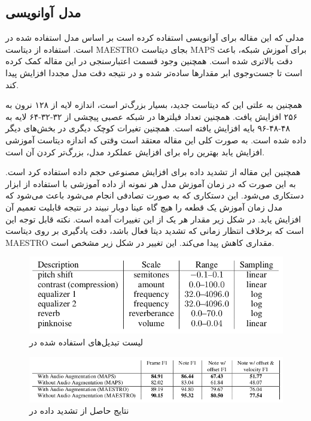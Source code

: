 \subsection{مدل آوانویسی}
مدلی که این مقاله برای آوانویسی استفاده کرده است بر اساس مدل استفاده شده در
\cite{hawthorne2017onsets}
است. استفاده از دیتاست
MAESTRO
بجای دیتاست
MAPS
برای آموزش شبکه، باعث دقت بالاتری شده است. همچنین وجود قسمت اعتبارسنجی در این
مقاله کمک کرده است تا جست‌وجوی ابر مقدارها ساده‌تر شده و در نتیجه دقت مدل مجددا
افزایش پیدا کند.

همچنین به علتی این که دیتاست جدید، بسیار بزرگ‌تر است، اندازه لایه
از ۱۲۸ نرون به ۲۵۶ افزایش یافت. همچنین تعداد فیلترها در شبکه عصبی پیچشی از
۳۲-۳۲-۶۴
لایه به
۴۸-۴۸-۹۶
بایه افزایش یافته است. همچنین تغیرات کوچک دیگری در بخش‌های دیگر داده شده است.
به صورت کلی این مقاله معتقد است وقتی که اندازه دیتاست آموزشی افزایش یابد بهترین
راه برای افزایش عملکرد مدل، بزرگ‌تر کردن آن است.

همچنین این مقاله از تشدید داده برای افزایش مصنوعی حجم داده استفاده کرد است.
به این صورت که در زمان آموزش مدل هر نمونه از داده آموزشی با استفاده از ابزار
دستکاری می‌شود. این دستکاری که به صورت تصادفی انجام می‌شود باعث می‌شود که مدل زمان
آموزش یک قطعه را هیچ گاه عینا دوبار نبیند در نتیجه قابلیت تعمیم آن افزایش یابد.
در شکل زیر مقدار هر یک از این تغییرات آمده است. نکته قابل توجه این است که
برخلاف انتظار زمانی که تشدید دیتا فعال باشد، دقت یادگیری بر روی دیتاست
MAESTRO
مقداری کاهش پیدا می‌کند. این تغییر در شکل زیر مشخص است.

\begin{figure}
    \includegraphics[width=\linewidth]
    {./statics/hawthorne2018enabling_augmentaion_parameters.png}
    \caption{لیست تبدیل‌های استفاده شده در \cite{hawthorne2018enabling}}
\end{figure}

\begin{figure}
    \includegraphics[width=\linewidth]
    {./statics/hawthorne2018enabling_augmentaion_results.png}
    \caption{نتایج حاصل از تشدید داده در \cite{hawthorne2018enabling}}
\end{figure}

